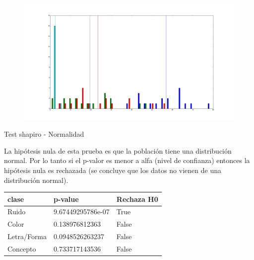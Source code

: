 \documentclass{beamer}
\begin{document}
\begin{frame}
\begin{figure}[c]
 \centering
  \begin{minipage}[c]{1\textwidth}
	\centering	
	\includegraphics[scale=0.22]{clases_hist.png}
  \end{minipage}
\end{figure}
\end{frame}







\begin{frame}{Test shapiro - Normalidad}

La hipótesis nula de esta prueba es que la población tiene una distribución normal. Por lo tanto si el p-valor es menor a alfa (nivel de confianza) entonces la hipótesis nula es rechazada (se concluye que los datos no vienen de una distribución normal).

\begin{center}
    \begin{tabular}{ | p{2cm} | p{3.5cm} | p{2cm} |}
    \hline
     clase       &  p-value               & Rechaza H0		\\ 
    \hline
     Ruido       &  9.67449295786e-07     & True 				\\ 
     Color       &  0.138976812363   	  &	False				\\ 
     Letra/Forma &  0.0948526263237       & False 				\\ 
	 Concepto    &  0.733717143536   	  &	False			\\ 
    \hline
    \end{tabular}
\end{center} 

\end{frame}
\end{document}
